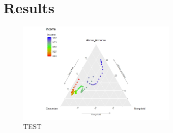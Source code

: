 \section{Results}\label{sec:results}


\begin{figure}
    \centering
    \includegraphics[width=0.7\textwidth]{figs/p_income.jpeg}
    \caption{TEST}\label{fig:test}
\end{figure}

